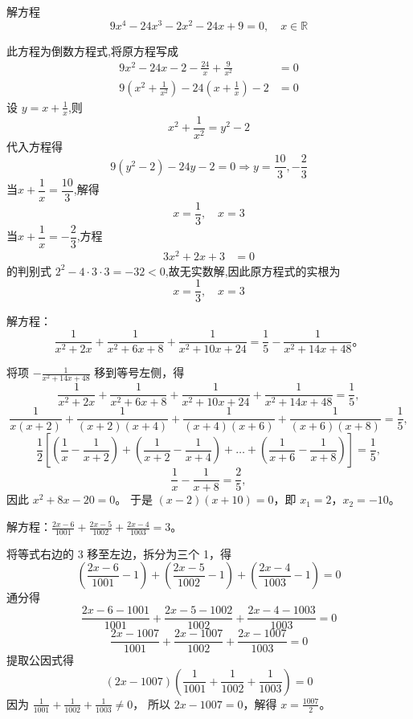 \begin{questions}
    \question 解方程
    \[
    9x^4 - 24x^3 - 2x^2 - 24x + 9 = 0, \quad x \in \mathbb{R}
    \]
    \begin{solution}
        此方程为倒数方程式,将原方程写成
        \begin{align*}
        9x^2 - 24x - 2 - \frac{24}{x} + \frac{9}{x^2} &= 0 \\
        9\left(x^2 + \frac{1}{x^2}\right) - 24\left(x + \frac{1}{x}\right) - 2 &= 0
        \end{align*}
        设 $y = x + \frac{1}{x}$,则
        \[
        x^2 + \frac{1}{x^2} = y^2 - 2
        \]
        代入方程得
        \[
        9(y^2-2) - 24y - 2 = 0 \Rightarrow y = \frac{10}{3},-\frac{2}{3}
        \]
        当$x + \dfrac{1}{x} = \dfrac{10}{3}$,解得
        \[
        x = \frac{1}{3}, \quad x = 3
        \]
        当$x + \dfrac{1}{x} = -\dfrac{2}{3}$,方程
        \begin{align*}
        3x^2 + 2x + 3 &= 0
        \end{align*}
        的判别式 $2^2-4\cdot3\cdot3 = -32 < 0$,故无实数解,因此原方程式的实根为
        \[
        x = \frac{1}{3}, \quad x = 3
        \]
    \end{solution}

    \question 解方程：
\[
\frac{1}{x^2 + 2x} + \frac{1}{x^2 + 6x + 8} + \frac{1}{x^2 + 10x + 24} = \frac{1}{5} - \frac{1}{x^2 + 14x + 48}。
\]

\begin{solution}
将项 $-\frac{1}{x^2 + 14x + 48}$ 移到等号左侧，得
\[
\frac{1}{x^2 + 2x} + \frac{1}{x^2 + 6x + 8} + \frac{1}{x^2 + 10x + 24} + \frac{1}{x^2 + 14x + 48} = \frac{1}{5},
\]
\[
\frac{1}{x(x + 2)} + \frac{1}{(x + 2)(x + 4)} + \frac{1}{(x + 4)(x + 6)} + \frac{1}{(x + 6)(x + 8)} = \frac{1}{5},
\]
\[
\frac{1}{2} \left[ \left( \frac{1}{x} - \frac{1}{x + 2} \right) + \left( \frac{1}{x + 2} - \frac{1}{x + 4} \right) + \dots + \left( \frac{1}{x + 6} - \frac{1}{x + 8} \right) \right] = \frac{1}{5},
\]
\[
\frac{1}{x} - \frac{1}{x + 8} = \frac{2}{5},
\]
因此 $x^2 + 8x - 20 = 0$。
于是 $(x - 2)(x + 10) = 0$，即 $x_1 = 2$，$x_2 = -10$。
\end{solution}

\question
解方程：$\frac{2x - 6}{1001} + \frac{2x - 5}{1002} + \frac{2x - 4}{1003} = 3$。

\begin{solution}
将等式右边的 3 移至左边，拆分为三个 1，得
\[
\left( \frac{2x - 6}{1001} - 1 \right) + \left( \frac{2x - 5}{1002} - 1 \right) + \left( \frac{2x - 4}{1003} - 1 \right) = 0
\]
通分得
\[
\frac{2x - 6 - 1001}{1001} + \frac{2x - 5 - 1002}{1002} + \frac{2x - 4 - 1003}{1003} = 0
\]
\[
\frac{2x - 1007}{1001} + \frac{2x - 1007}{1002} + \frac{2x - 1007}{1003} = 0
\]
提取公因式得
\[
(2x - 1007) \left( \frac{1}{1001} + \frac{1}{1002} + \frac{1}{1003} \right) = 0
\]
因为 $\frac{1}{1001} + \frac{1}{1002} + \frac{1}{1003} \neq 0$，
所以 $2x - 1007 = 0$，解得 $x = \frac{1007}{2}$。
\end{solution}


\end{questions}
